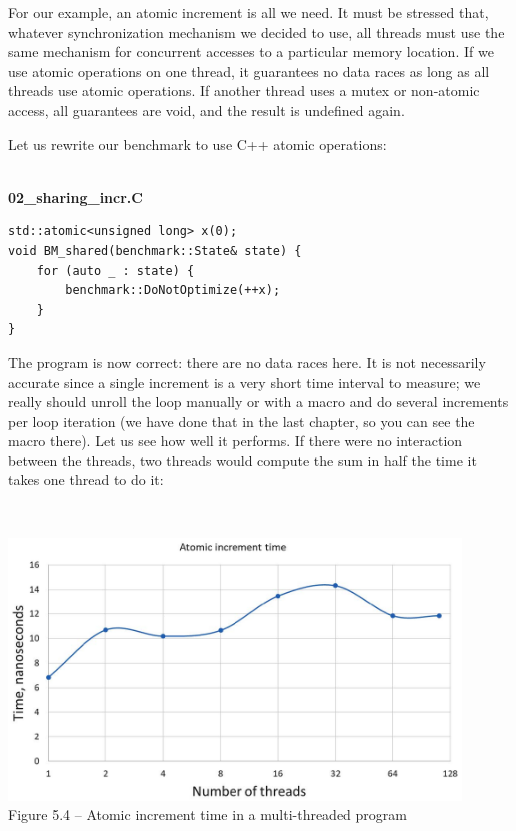 For our example, an atomic increment is all we need. It must be stressed that, whatever synchronization mechanism we decided to use, all threads must use the same mechanism for concurrent accesses to a particular memory location. If we use atomic operations on one thread, it guarantees no data races as long as all threads use atomic operations. If another thread uses a mutex or non-atomic access, all guarantees are void, and the result is undefined again.

Let us rewrite our benchmark to use C++ atomic operations:

\hspace*{\fill} \\ %
\noindent
\textbf{02\_sharing\_incr.C}
\begin{lstlisting}[style=styleCXX]
std::atomic<unsigned long> x(0);
void BM_shared(benchmark::State& state) {
	for (auto _ : state) {
		benchmark::DoNotOptimize(++x);
	}
}
\end{lstlisting}

The program is now correct: there are no data races here. It is not necessarily accurate since a single increment is a very short time interval to measure; we really should unroll the loop manually or with a macro and do several increments per loop iteration (we have done that in the last chapter, so you can see the macro there). Let us see how well it performs. If there were no interaction between the threads, two threads would compute the sum in half the time it takes one thread to do it:

\hspace*{\fill} \\ %
\begin{center}
\includegraphics[width=0.9\textwidth]{content/1/chapter5/images/4.jpg}\\
Figure 5.4 – Atomic increment time in a multi-threaded program
\end{center}

